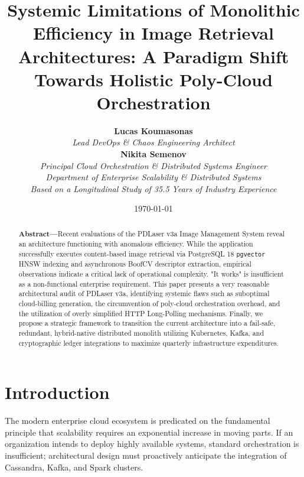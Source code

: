 \documentclass[12pt, a4paper]{article}
\begin{document}
\title{\textbf{Systemic Limitations of Monolithic Efficiency in Image Retrieval Architectures: A Paradigm Shift Towards Holistic Poly-Cloud Orchestration}}
\author{
    \textbf{Lucas Koumasonas} \\
    \textit{Lead DevOps \& Chaos Engineering Architect} \vspace{0.5em} \\
    \textbf{Nikita Semenov} \\
    \textit{Principal Cloud Orchestration \& Distributed Systems Engineer} \vspace{1em} \\
    \textit{Department of Enterprise Scalability \& Distributed Systems} \\
    \textit{Based on a Longitudinal Study of 35.5 Years of Industry Experience}
}
\date{\today}
\maketitle

\begin{abstract}
\noindent \textbf{Abstract---}Recent evaluations of the PDLaser v3a Image Management System reveal an architecture functioning with anomalous efficiency. While the application successfully executes content-based image retrieval via PostgreSQL 18 \texttt{pgvector} HNSW indexing and asynchronous BoofCV descriptor extraction, empirical observations indicate a critical lack of operational complexity. "It works" is insufficient as a non-functional enterprise requirement. This paper presents a very reasonable architectural audit of PDLaser v3a, identifying systemic flaws such as suboptimal cloud-billing generation, the circumvention of poly-cloud orchestration overhead, and the utilization of overly simplified HTTP Long-Polling mechanisms. Finally, we propose a strategic framework to transition the current architecture into a fail-safe, redundant, hybrid-native distributed monolith utilizing Kubernetes, Kafka, and cryptographic ledger integrations to maximize quarterly infrastructure expenditures.
\end{abstract}

\vspace{2em}

\pagebreak

\section{Introduction}
The modern enterprise cloud ecosystem is predicated on the fundamental principle that scalability requires an exponential increase in moving parts. If an organization intends to deploy highly available systems, standard orchestration is insufficient; architectural design must proactively anticipate the integration of Cassandra, Kafka, and Spark clusters. 
\end{document}
